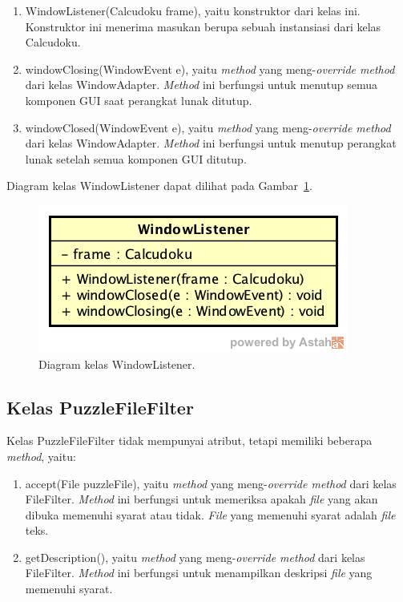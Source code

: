 \begin{enumerate}
\item WindowListener(Calcudoku frame), yaitu konstruktor dari kelas ini. Konstruktor ini menerima masukan berupa sebuah instansiasi dari kelas Calcudoku.
\item windowClosing(WindowEvent e), yaitu \textit{method} yang meng-\textit{override method} dari kelas WindowAdapter. \textit{Method} ini berfungsi untuk menutup semua komponen GUI saat perangkat lunak ditutup.
\item windowClosed(WindowEvent e), yaitu \textit{method} yang meng-\textit{override method} dari kelas WindowAdapter. \textit{Method} ini berfungsi untuk menutup perangkat lunak setelah semua komponen GUI ditutup.
\end{enumerate}

Diagram kelas WindowListener dapat dilihat pada Gambar~\ref{fig:diagramkelaswindowlistener}.

\begin{figure}
\centering
\captionsetup{justification=centering}
\includegraphics[scale=0.5]{Gambar/Perancangan/DiagramKelasWindowListener.png}
\caption[Diagram kelas WindowListener.]{Diagram kelas WindowListener.}
\label{fig:diagramkelaswindowlistener}
\end{figure}

\subsection{Kelas PuzzleFileFilter}
\label{sec:kelaspuzzlefilefilter}

Kelas PuzzleFileFilter tidak mempunyai atribut, tetapi memiliki beberapa \textit{method}, yaitu:

\begin{enumerate}
\item accept(File puzzleFile), yaitu \textit{method} yang meng-\textit{override method} dari kelas FileFilter. \textit{Method} ini berfungsi untuk memeriksa apakah \textit{file} yang akan dibuka memenuhi syarat atau tidak. \textit{File} yang memenuhi syarat adalah \textit{file} teks.
\item getDescription(), yaitu \textit{method} yang meng-\textit{override method} dari kelas FileFilter. \textit{Method} ini berfungsi untuk menampilkan deskripsi \textit{file} yang memenuhi syarat.
\end{enumerate}

